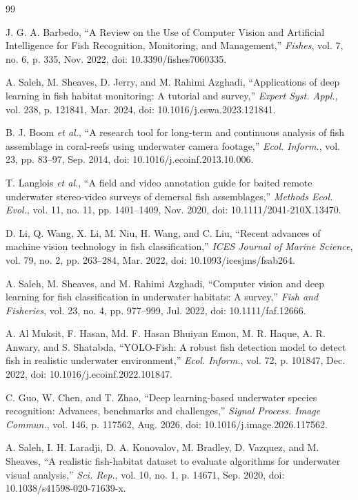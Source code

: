 \documentclass[preprint,12pt]{elsarticle}
\begin{document}
\begin{thebibliography}{99}

 J. G. A. Barbedo, ``A Review on the Use of Computer Vision and
Artificial Intelligence for Fish Recognition, Monitoring, and
Management,'' \emph{Fishes}, vol. 7, no. 6, p. 335, Nov. 2022, doi:
10.3390/fishes7060335.

 A. Saleh, M. Sheaves, D. Jerry, and M. Rahimi Azghadi,
``Applications of deep learning in fish habitat monitoring: A tutorial
and survey,'' \emph{Expert Syst. Appl.}, vol. 238, p. 121841, Mar. 2024,
doi: 10.1016/j.eswa.2023.121841.

 B. J. Boom \emph{et al.}, ``A research tool for long-term and
continuous analysis of fish assemblage in coral-reefs using underwater
camera footage,'' \emph{Ecol. Inform.}, vol. 23, pp. 83--97, Sep. 2014,
doi: 10.1016/j.ecoinf.2013.10.006.

 T. Langlois \emph{et al.}, ``A field and video annotation guide
for baited remote underwater stereo‐video surveys of demersal fish
assemblages,'' \emph{Methods Ecol. Evol.}, vol. 11, no. 11, pp.
1401--1409, Nov. 2020, doi: 10.1111/2041-210X.13470.

 D. Li, Q. Wang, X. Li, M. Niu, H. Wang, and C. Liu, ``Recent
advances of machine vision technology in fish classification,''
\emph{ICES Journal of Marine Science}, vol. 79, no. 2, pp. 263--284,
Mar. 2022, doi: 10.1093/icesjms/fsab264.

 A. Saleh, M. Sheaves, and M. Rahimi Azghadi, ``Computer vision
and deep learning for fish classification in underwater habitats: A
survey,'' \emph{Fish and Fisheries}, vol. 23, no. 4, pp. 977--999, Jul.
2022, doi: 10.1111/faf.12666.

 A. Al Muksit, F. Hasan, Md. F. Hasan Bhuiyan Emon, M. R. Haque,
A. R. Anwary, and S. Shatabda, ``YOLO-Fish: A robust fish detection
model to detect fish in realistic underwater environment,'' \emph{Ecol.
Inform.}, vol. 72, p. 101847, Dec. 2022, doi:
10.1016/j.ecoinf.2022.101847.

 C. Guo, W. Chen, and T. Zhao, ``Deep learning-based underwater
species recognition: Advances, benchmarks and challenges,'' \emph{Signal
Process. Image Commun.}, vol. 146, p. 117562, Aug. 2026, doi:
10.1016/j.image.2026.117562.

 A. Saleh, I. H. Laradji, D. A. Konovalov, M. Bradley, D.
Vazquez, and M. Sheaves, ``A realistic fish-habitat dataset to evaluate
algorithms for underwater visual analysis,'' \emph{Sci. Rep.}, vol. 10,
no. 1, p. 14671, Sep. 2020, doi: 10.1038/s41598-020-71639-x.


\end{thebibliography}
\end{document}
